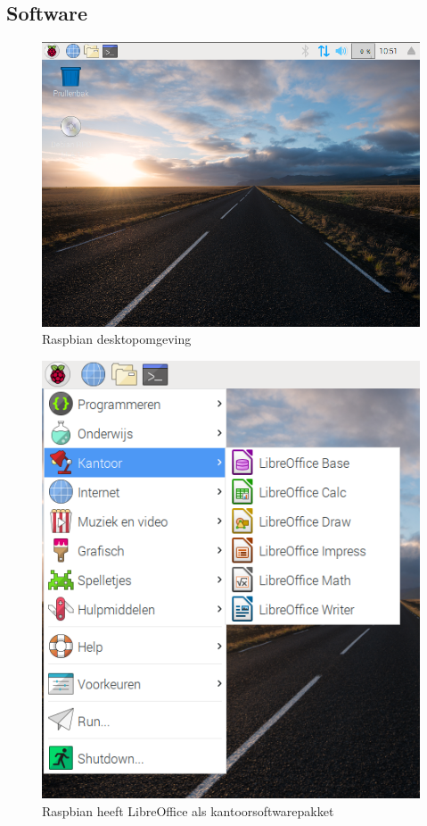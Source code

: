 \documentclass[a4paper, dutch, abstract=true]{scrartcl}
\begin{document}
\subsection{Software}
\begin{figure}[h]
    \centering
    \includegraphics[scale=0.5]{raspbian.png}
    \caption{Raspbian desktopomgeving}
    \label{fig:raspbian}
\end{figure}
\begin{figure}[h]
    \centering
    \includegraphics[scale=0.5]{raspbian-libreoffice.png}
    \caption{Raspbian heeft LibreOffice als kantoorsoftwarepakket}
    \label{fig:raspbian-libreoffice}
\end{figure}
\end{document}
